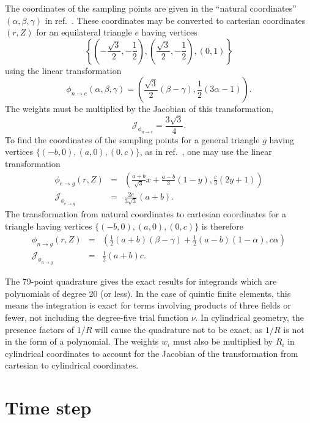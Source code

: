 \documentclass[letterpaper]{book}
\begin{document}
The coordinates of the sampling points are given in the ``natural
coordinates'' $(\alpha, \beta, \gamma)$ in ref.~\cite{Dunavant85}.
These coordinates may be converted to cartesian coordinates $(r, Z)$
for an equilateral triangle $e$ having vertices
\[
\left\{\left(-\frac{\sqrt{3}}{2},-\frac{1}{2}\right),
\left(\frac{\sqrt{3}}{2},-\frac{1}{2}\right), (0,1)\right\} 
\]
using the linear transformation
\[ 
\phi_{n \to e}(\alpha, \beta, \gamma) = 
\left(\frac{\sqrt{3}}{2}(\beta-\gamma), \frac{1}{2}(3 \alpha - 1)
\right).
\]
The weights must be multiplied by the Jacobian of this transformation,
\[
\mathcal{J}_{\phi_{n \to e}} = \frac{3 \sqrt{3}}{4}.
\]
To find the coordinates of the sampling points for a general triangle
$g$ having vertices $\{(-b,0), (a,0), (0,c)\}$, as in
ref.~\cite{Jardin04}, one may use the linear transformation
\begin{eqnarray*}
  \phi_{e \to g}(r,Z) & = & 
    \left(\frac{a+b}{\sqrt{3}} x + \frac{a-b}{3} (1-y), 
    \frac{c}{3}(2y+1) \right) \\
  \mathcal{J}_{\phi_{e \to g}} & = &  \frac{2 c}{3 \sqrt{3}} (a+b).
\end{eqnarray*}
The transformation from natural coordinates to cartesian coordinates
for a triangle having vertices $\{(-b,0), (a,0), (0,c)\}$ is therefore
\begin{eqnarray*}
  \phi_{n \to g}(r,Z) & = & 
  \left(\frac{1}{2} (a+b) (\beta-\gamma) +
  \frac{1}{2} (a-b)(1-\alpha), c \alpha \right) \\
  \mathcal{J}_{\phi_{n \to g}} & = & \frac{1}{2} (a+b) c.
\end{eqnarray*}

The 79-point quadrature gives the exact results for integrands which
are polynomials of degree 20 (or less).  In the case of quintic finite
elements, this means the integration is exact for terms involving
products of three fields or fewer, not including the degree-five
trial function $\nu$.  In cylindrical geometry, the presence factors
of $1/R$ will cause the quadrature not to be exact, as $1/R$ is not in
the form of a polynomial.  The weights $w_i$ must also be multiplied
by $R_i$ in cylindrical coordinates to account for the Jacobian of the
transformation from cartesian to cylindrical coordinates.


\section{Time step}
\end{document}
